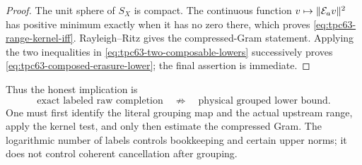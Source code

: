 \begin{proof}
The unit sphere of \(S_X\) is compact.  The continuous function
\(v\mapsto\|\mathcal E_av\|^2\) has positive minimum exactly when it has no zero
there, which proves \eqref{eq:tpc63-range-kernel-iff}.  Rayleigh--Ritz gives
the compressed-Gram statement.  Applying the two inequalities in
\eqref{eq:tpc63-two-composable-lowers} successively proves
\eqref{eq:tpc63-composed-erasure-lower}; the final assertion is immediate.
\end{proof}

Thus the honest implication is
\begin{equation}
 \boxed{
 \text{exact labeled raw completion}
 \quad\not\Longrightarrow\quad
 \text{physical grouped lower bound}.}
 \label{eq:tpc63-labelled-not-physical}
\end{equation}
One must first identify the literal grouping map and the actual upstream
range, apply the kernel test, and only then estimate the compressed Gram.
The logarithmic number of labels controls bookkeeping and certain upper
norms; it does not control coherent cancellation after grouping.
